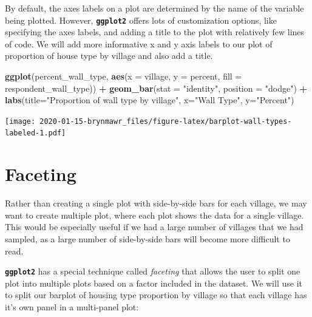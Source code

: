 \documentclass[]{book}
\newenvironment{Shaded}{\begin{snugshade}}{\end{snugshade}}
\newcommand{\KeywordTok}[1]{\textcolor[rgb]{0.13,0.29,0.53}{\textbf{#1}}}
\newcommand{\DataTypeTok}[1]{\textcolor[rgb]{0.13,0.29,0.53}{#1}}
\newcommand{\StringTok}[1]{\textcolor[rgb]{0.31,0.60,0.02}{#1}}
\newcommand{\OperatorTok}[1]{\textcolor[rgb]{0.81,0.36,0.00}{\textbf{#1}}}
\newcommand{\NormalTok}[1]{#1}
\begin{document}
By default, the axes labels on a plot are determined by the name of the
variable being plotted. However, \textbf{\texttt{ggplot2}} offers lots
of customization options, like specifying the axes labels, and adding a
title to the plot with relatively few lines of code. We will add more
informative x and y axis labels to our plot of proportion of house type
by village and also add a title.

\begin{Shaded}
\begin{Highlighting}[]
\KeywordTok{ggplot}\NormalTok{(percent_wall_type, }\KeywordTok{aes}\NormalTok{(}\DataTypeTok{x =}\NormalTok{ village, }\DataTypeTok{y =}\NormalTok{ percent, }\DataTypeTok{fill =}\NormalTok{ respondent_wall_type)) }\OperatorTok{+}
\StringTok{    }\KeywordTok{geom_bar}\NormalTok{(}\DataTypeTok{stat =} \StringTok{"identity"}\NormalTok{, }\DataTypeTok{position =} \StringTok{"dodge"}\NormalTok{) }\OperatorTok{+}
\StringTok{    }\KeywordTok{labs}\NormalTok{(}\DataTypeTok{title=}\StringTok{"Proportion of wall type by village"}\NormalTok{,}
         \DataTypeTok{x=}\StringTok{"Wall Type"}\NormalTok{,}
         \DataTypeTok{y=}\StringTok{"Percent"}\NormalTok{)}
\end{Highlighting}
\end{Shaded}

\texttt{[image: 2020-01-15-brynmawr\_files/figure-latex/barplot-wall-types-labeled-1.pdf]}

\section{Faceting}\label{faceting}

Rather than creating a single plot with side-by-side bars for each
village, we may want to create multiple plot, where each plot shows the
data for a single village. This would be especially useful if we had a
large number of villages that we had sampled, as a large number of
side-by-side bars will become more difficult to read.

\textbf{\texttt{ggplot2}} has a special technique called \emph{faceting}
that allows the user to split one plot into multiple plots based on a
factor included in the dataset. We will use it to split our barplot of
housing type proportion by village so that each village has it's own
panel in a multi-panel plot:
\end{document}
